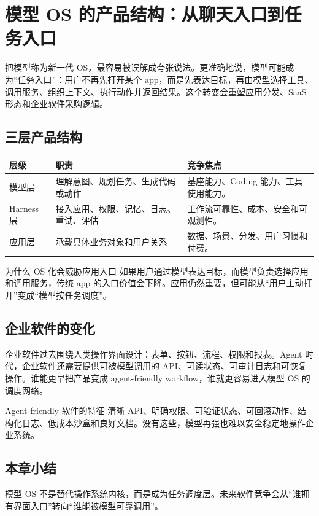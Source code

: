 \section{模型 OS 的产品结构：从聊天入口到任务入口}

把模型称为新一代 OS，最容易被误解成夸张说法。更准确地说，模型可能成为“任务入口”：用户不再先打开某个 app，而是先表达目标，再由模型选择工具、调用服务、组织上下文、执行动作并返回结果。这个转变会重塑应用分发、SaaS 形态和企业软件采购逻辑。

\subsection{三层产品结构}

\noindent\begin{longtable}{p{}p{}p{}}
\toprule
层级 & 职责 & 竞争焦点 \\
\midrule
模型层 & 理解意图、规划任务、生成代码或动作 & 基座能力、Coding 能力、工具使用能力。 \\
Harness 层 & 接入应用、权限、记忆、日志、重试、评估 & 工作流可靠性、成本、安全和可观测性。 \\
应用层 & 承载具体业务对象和用户关系 & 数据、场景、分发、用户习惯和付费。 \\
\bottomrule
\end{longtable}

\begin{knowledgebox}{为什么 OS 化会威胁应用入口}
如果用户通过模型表达目标，而模型负责选择应用和调用服务，传统 app 的入口价值会下降。应用仍然重要，但可能从“用户主动打开”变成“模型按任务调度”。
\end{knowledgebox}

\subsection{企业软件的变化}

企业软件过去围绕人类操作界面设计：表单、按钮、流程、权限和报表。Agent 时代，企业软件还需要提供可被模型调用的 API、可读状态、可审计日志和可恢复操作。谁能更早把产品变成 agent-friendly workflow，谁就更容易进入模型 OS 的调度网络。

\begin{importantbox}{Agent-friendly 软件的特征}
清晰 API、明确权限、可验证状态、可回滚动作、结构化日志、低成本沙盒和良好文档。没有这些，模型再强也难以安全稳定地操作企业系统。
\end{importantbox}

\subsection{本章小结}

模型 OS 不是替代操作系统内核，而是成为任务调度层。未来软件竞争会从“谁拥有界面入口”转向“谁能被模型可靠调用”。

